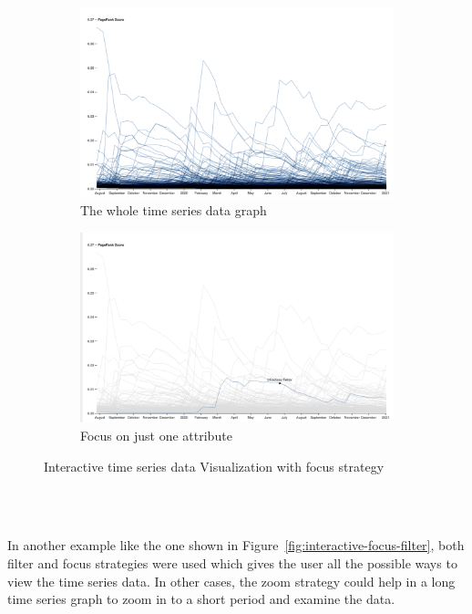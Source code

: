 \begin{figure}[h]
\begin{subfigure}{.5\textwidth}
  \centering
  \captionsetup{justification=centering}
  \includegraphics[width=.8\linewidth]{Report-latex/tex_files/pics/time21.png}  
  \caption{The whole time series data graph}
  \label{fig:sub-first}
\end{subfigure}
\begin{subfigure}{.5\textwidth}
  \centering
  \captionsetup{justification=centering}
  \includegraphics[width=1\linewidth]{Report-latex/tex_files/pics/time22.png}  
  \caption{Focus on just one attribute}
  \label{fig:sub-second}
\end{subfigure}
\captionsetup{justification=centering}
\caption{Interactive time series data Visualization with focus strategy \cite{multiplelines} }
\label{fig:interactive-ts}
\end{figure}

\\\ 

In another example like the one shown in Figure~\ref{fig:interactive-focus-filter}, both filter and focus strategies were used which gives the user all the possible ways to view the time series data. In other cases, the zoom strategy could help in a long time series graph to zoom in to a short period and examine the data. 

